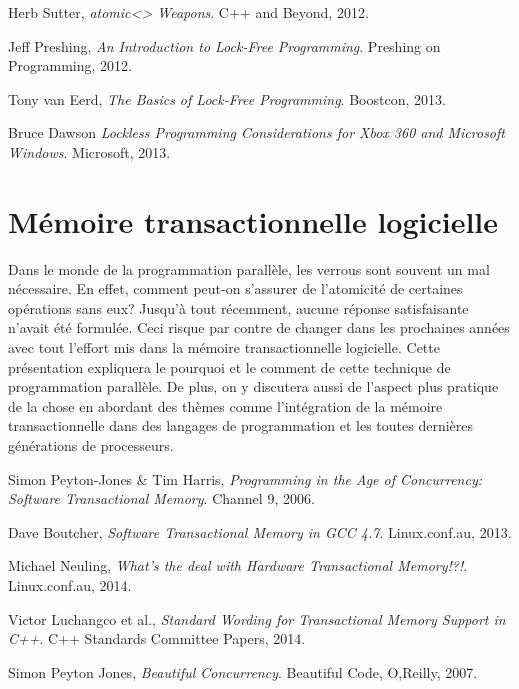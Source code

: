 \documentclass{article}
\begin{document}
\renewcommand\refname{Références LockFree}
\begin{thebibliography}{9}
          Herb Sutter,
          \emph{atomic<> Weapons}.
          C++ and Beyond, 2012.
          
          Jeff Preshing,
          \emph{An Introduction to Lock-Free Programming}.
          Preshing on Programming, 2012.
          
          Tony van Eerd,
          \emph{The Basics of Lock-Free Programming}.
          Boostcon, 2013.
          
          Bruce Dawson
          \emph{Lockless Programming Considerations for Xbox 360 and Microsoft Windows}.
          Microsoft, 2013.
\end{thebibliography}

\newpage

\section*{Mémoire transactionnelle logicielle}
Dans le monde de la programmation parallèle, les verrous sont souvent un mal nécessaire. En effet, comment peut-on s'assurer de l'atomicité de certaines opérations sans eux? Jusqu'à tout récemment, aucune réponse satisfaisante n'avait été formulée. Ceci risque par contre de changer dans les prochaines années avec tout l'effort mis dans la mémoire transactionnelle logicielle. Cette présentation expliquera le pourquoi et le comment de cette technique de programmation parallèle. De plus, on y discutera aussi de l'aspect plus pratique de la chose en abordant des thèmes comme l'intégration de la mémoire transactionnelle dans des langages de programmation et les toutes dernières générations de processeurs.

\renewcommand\refname{Références STM}
\begin{thebibliography}{9}
          Simon Peyton-Jones \& Tim Harris,
          \emph{Programming in the Age of Concurrency: Software Transactional Memory}.
          Channel 9, 2006.
          
          Dave Boutcher,
          \emph{Software Transactional Memory in GCC 4.7}.
          Linux.conf.au, 2013.
          
          Michael Neuling,
          \emph{What's the deal with Hardware Transactional Memory!?!}.
          Linux.conf.au, 2014.
          
          Victor Luchangco et al.,
          \emph{Standard Wording for Transactional Memory Support in C++}.
          C++ Standards Committee Papers, 2014.
          
          Simon Peyton Jones,
          \emph{Beautiful Concurrency}.
          Beautiful Code, O,Reilly, 2007.
         
\end{thebibliography}
\end{document}
